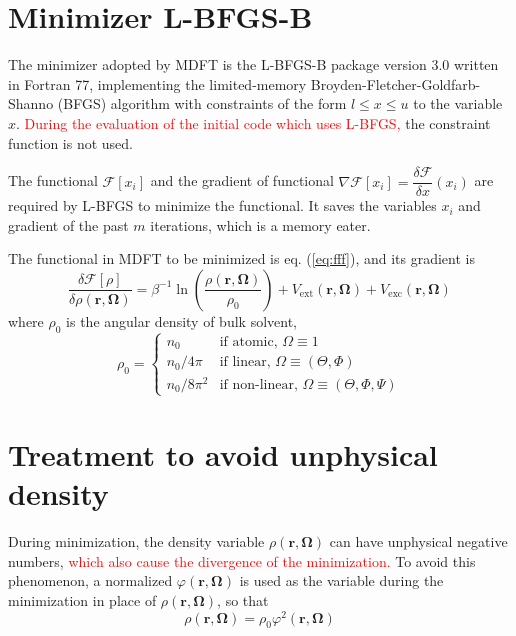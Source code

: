 \section{Minimizer L-BFGS-B}

The minimizer adopted by MDFT is the L-BFGS-B \citep{Zhu_1994_bfgs,Zhu_bfgs_1997_algorithm}
package version 3.0 written in Fortran 77, implementing the limited-memory
Broyden-Fletcher-Goldfarb-Shanno (BFGS) algorithm with constraints
of the form $l\leq x\leq u$ to the variable $x$. \textcolor{red}{During
the evaluation of the initial code which uses L-BFGS,} the constraint
function is not used.

The functional $\mathcal{F}[x_{i}]$ and the gradient of functional
$\nabla\mathcal{F}[x_{i}]=\dfrac{\delta\mathcal{F}}{\delta x}(x_{i})$
are required by L-BFGS to minimize the functional. It saves the variables
$x_{i}$ and gradient of the past $m$ iterations, which is a memory
eater.

The functional in MDFT to be minimized is eq. (\ref{eq:fff}), and
its gradient is
\begin{equation}
\frac{\delta\mathcal{F}[\rho]}{\delta\rho(\mathbf{r},\mathbf{\Omega})}=\beta^{-1}\ln\left(\dfrac{\rho(\mathbf{r},\mathbf{\Omega})}{\rho_{0}}\right)+V_{\mathrm{ext}}(\mathbf{r},\mathbf{\Omega})+V_{\mathrm{exc}}(\mathbf{r},\mathbf{\Omega})
\end{equation}
where $\rho_{0}$ is the angular density of bulk solvent, 
\begin{equation}
\rho_{0}=\left\{ \begin{array}{ll}
n_{0} & \mbox{if atomic, }\Omega\equiv1\\
n_{0}/4\pi & \mbox{if linear, }\Omega\equiv(\Theta,\Phi)\\
n_{0}/8\pi^{2} & \mbox{if non-linear, }\Omega\equiv(\Theta,\Phi,\Psi)
\end{array}\right.\label{eq:rho}
\end{equation}


\section{Treatment to avoid unphysical density}

During minimization, the density variable $\rho(\mathbf{r},\mathbf{\Omega})$
can have unphysical negative numbers, \textcolor{red}{which also cause
the divergence of the minimization.} To avoid this phenomenon, a normalized
$\varphi(\mathbf{r},\mathbf{\Omega})$ is used as the variable during
the minimization in place of $\rho(\mathbf{r},\mathbf{\Omega})$,
so that
\begin{equation}
\rho(\mathbf{r},\mathbf{\Omega})=\rho_{0}\varphi^{2}(\mathbf{r},\mathbf{\Omega})\label{eq:cg_vect}
\end{equation}

